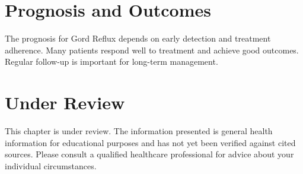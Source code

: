 \section*{Prognosis and Outcomes}
The prognosis for Gord Reflux depends on early detection and treatment adherence. Many patients respond well to treatment and achieve good outcomes. Regular follow-up is important for long-term management.
\section*{Under Review}
This chapter is under review. The information presented is general health information for educational purposes and has not yet been verified against cited sources. Please consult a qualified healthcare professional for advice about your individual circumstances.


\clearpage
